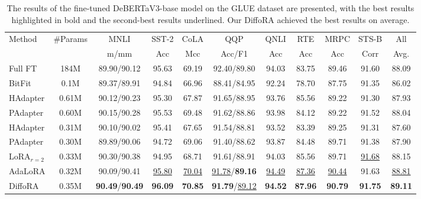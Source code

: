 
\begin{table*}
  \centering
  \begin{tabular}{@{}l|c|ccccccccc@{}}
    \toprule
    \multirow{2}{*}{Method} & \multirow{2}{*}{\#Params} & MNLI & SST-2 & CoLA & QQP & QNLI & RTE & MRPC & STS-B & All \\
     & & m/mm & Acc & Mcc & Acc/F1 & Acc & Acc & Acc & Corr & Avg.\\
    \midrule
    Full FT & 184M & 89.90/90.12 & 95.63 & 69.19 & 92.40/89.80 & 94.03 & 83.75 & 89.46 & 91.60 &88.09\\
    \midrule
    BitFit & 0.1M & 89.37/89.91 & 94.84 & 66.96 & 88.41/84.95 & 92.24 & 78.70 & 87.75 & 91.35 & 86.02 \\
    \midrule
    HAdapter &0.61M& 90.12/90.23& 95.30& 67.87 &91.65/88.95& 93.76& 85.56 &89.22& 91.30& 87.93\\
    PAdapter& 0.60M& 90.15/90.28& 95.53 &69.48 &91.62/88.86& 93.98 &84.12 &89.22& 91.52& 88.04\\
    HAdapter &0.31M& 90.10/90.02& 95.41& 67.65& 91.54/88.81& 93.52& 83.39& 89.25& 91.31& 87.60\\
    PAdapter &0.30M& 89.89/90.06& 94.72 &69.06 &91.40/88.62& 93.87& 84.48& 89.71 &91.38& 87.90\\
    LoRA$_{r=2}$ &0.33M& 90.30/90.38& 94.95 &68.71& 91.61/88.91 &94.03 &85.56& 89.71& \underline{91.68}& 88.15\\
    AdaLoRA& 0.32M& 90.09/90.41& \underline{95.80}& \underline{70.04}& \underline{91.78}/\textbf{89.16}& \underline{94.49} &\underline{87.36} &\underline{90.44} &91.63& \underline{88.81}\\
    \midrule
    \rowcolor{gray!20} DiffoRA& 0.35M &\textbf{90.49}/\textbf{90.49}&\textbf{96.09} &\textbf{70.85} & \textbf{91.79}/\underline{89.12}& \textbf{94.52}& \textbf{87.96}& \textbf{90.79}& \textbf{91.75}&  \textbf{89.11}\\
    \bottomrule
  \end{tabular}
  \caption{The results of the fine-tuned DeBERTaV3-base model on the GLUE dataset are presented, with the best results highlighted in bold and the second-best results underlined. Our DiffoRA achieved the best results on average.}
  \label{tab: glue}
\end{table*}

